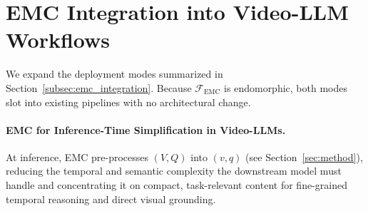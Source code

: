\begin{table}[ht]
  \centering
  \small
  \setlength{\tabcolsep}{4pt}
  \caption{Full per-source caption breakdown for ReSimplifyIt. \#loc abbreviates \#localize. Passive captions are pre-loaded into agent prompts; active captions are fetched during tool execution.}
  \label{tab:cost_full_breakdown}
\end{table}


\section{EMC Integration into Video-LLM Workflows}
\label{appendix:emc_integration}

We expand the deployment modes summarized in Section~\ref{subsec:emc_integration}. Because $\mathcal{F}_{\text{EMC}}$ is endomorphic, both modes slot into existing pipelines with no architectural change.

\paragraph{EMC for Inference-Time Simplification in Video-LLMs.} At inference, EMC pre-processes $(V, Q)$ into $(v, q)$ (see Section~\ref{sec:method}), reducing the temporal and semantic complexity the downstream model must handle and concentrating it on compact, task-relevant content for fine-grained temporal reasoning and direct visual grounding.

